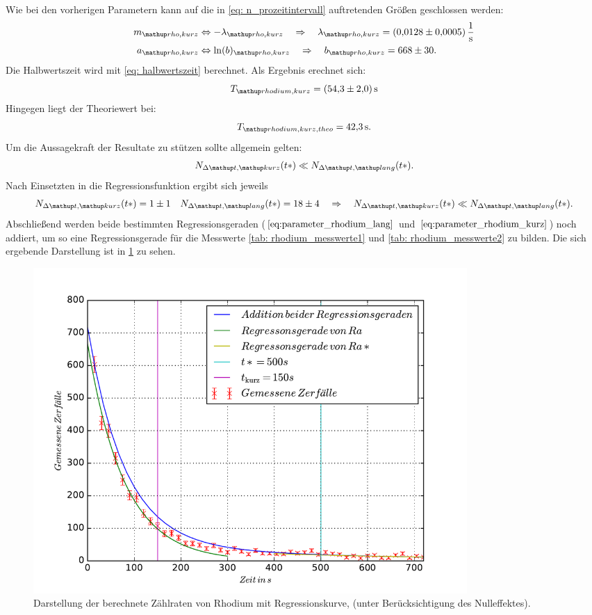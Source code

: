 Wie bei den vorherigen Parametern kann auf die in \eqref{eq: n_prozeitintervall} auftretenden Größen %
geschlossen werden: %
\begin{align}
  \label{eq:parameter_rhodium_kurz_lambda}
  \begin{aligned}
    m\ua{rho,kurz}&\Leftrightarrow -\lambda\ua{rho,kurz} \quad \Rightarrow \quad \lambda\ua{rho,kurz}=\SI{0.0128\pm0.0005}{\per\second}\\
    a\ua{rho,kurz}&\Leftrightarrow \ln(b)\ua{rho,kurz} \quad \Rightarrow \quad b\ua{rho,kurz} =668\pm 30.
  \end{aligned}
\end{align}
Die Halbwertszeit wird mit \eqref{eq: halbwertszeit} berechnet.
Als Ergebnis erechnet sich:
\begin{equation}
  \label{eq:halbwertzeit_rhodium_kurz}
  T\ua{rhodium, kurz}=\SI{54.3\pm2.0 }{\second}
\end{equation}
Hingegen liegt der Theoriewert\cite{rhodium_kurz_halb} bei:
\begin{equation}
  \label{eq:halbwertzeit_rhodium_kurz_theo}
  T\ua{rhodium, kurz, theo}=\SI{42.3}{\second}.
\end{equation}
Um die Aussagekraft der Resultate zu stützen sollte allgemein gelten:
\begin{equation*}
  N_{\Delta \map{t}, \map{kurz}}(t*)\ll N_{\Delta \map{t}, \map{lang}}(t*).
\end{equation*}
Nach Einsetzten in die Regressionsfunktion ergibt sich jeweils %
\begin{equation*}
    N_{\Delta \map{t}, \map{kurz}}(t*)= 1\pm1 \quad  N_{\Delta \map{t}, \map{lang}}(t*)= 18\pm 4 \quad \Rightarrow \quad N_{\Delta \map{t}, \map{kurz}}(t*)\ll N_{\Delta \map{t}, \map{lang}}(t*).
\end{equation*}
Abschließend werden beide bestimmten Regressionsgeraden ($\eqref{eq:parameter_rhodium_lang}$ und $\eqref{eq:parameter_rhodium_kurz}$) noch addiert, um so eine %
Regressionsgerade für die Messwerte \ref{tab: rhodium_messwerte1} und \ref{tab: rhodium_messwerte2} zu bilden.
Die sich ergebende Darstellung ist in \ref{fig: plot_rhodium_addi} zu sehen. %
\begin{figure}
  \centering
  \includegraphics[width=0.8\textwidth]{pics/ra_addi.pdf}
  \caption{Darstellung der berechnete Zählraten von Rhodium mit Regressionskurve, (unter Berücksichtigung des Nulleffektes).} %
  \label{fig: plot_rhodium_addi}
\end{figure}
